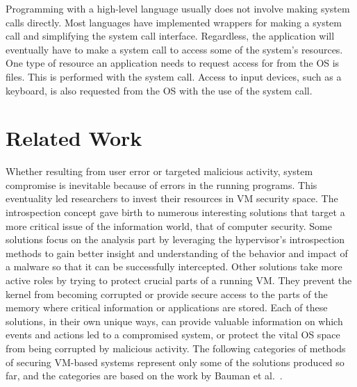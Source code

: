\par Programming with a high-level language usually does not involve making system calls directly. Most languages have implemented wrappers for making a system call and simplifying the system call interface. Regardless, the application will eventually have to make a system call to access some of the system's resources. One type of resource an application needs to request access for from the \ac{OS} is files. This is performed with the  system call. Access to input devices, such as a keyboard, is also requested from the \ac{OS} with the use of the  system call.

\section{Related Work}\label{sec:related}

\par Whether resulting from user error or targeted malicious activity, system compromise is inevitable because of errors in the running programs. This eventuality led researchers to invest their resources in \ac{VM} security space. The introspection concept gave birth to numerous interesting solutions that target a more critical issue of the information world, that of computer security. Some solutions focus on the analysis part by leveraging the hypervisor's introspection methods to gain better insight and understanding of the behavior and impact of a malware so that it can be successfully intercepted. Other solutions take more active roles by trying to protect crucial parts of a running \ac{VM}. They prevent the kernel from becoming corrupted or provide secure access to the parts of the memory where critical information or applications are stored. 
Each of these solutions, in their own unique ways, can provide valuable information on which events and actions led to a compromised system, or protect the vital \ac{OS} space from being corrupted by malicious activity. 
The following categories of methods of securing \ac{VM}-based systems represent only some of the solutions produced so far, and the categories are based on the work by Bauman et al.~\cite{bauman2015survey}.

